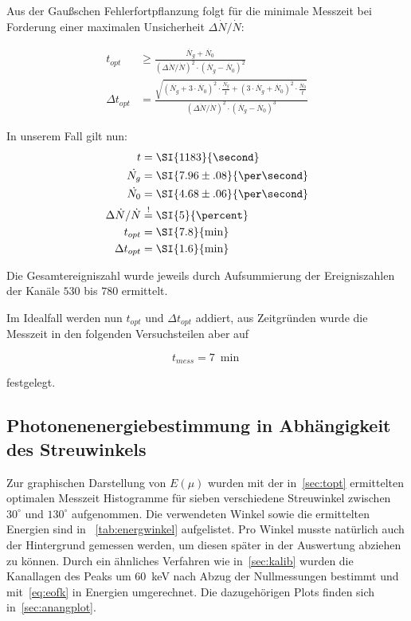 \documentclass[slug=CS, room=Andreas-Schubert-Bau\,\ Labor\ 406,
supervisor=Juliane\ Volkmer, coursedate=29.\ 11.\ 2019]{../../Lab_Report_LaTeX/lab_report}
\newcommand{\kev}[1]{\SI{#1}{\kilo\electronvolt}}
\begin{document}
Aus der Gau\ss{}schen Fehlerfortpflanzung folgt f\"ur die minimale
Messzeit bei Forderung einer maximalen Unsicherheit
\(\Delta\dot{N}/\dot{N}\):

\begin{align}
  \label{eq:mtime}
  t_{opt} & \geq\frac{\dot{N_g} +
            \dot{N_0}}{(\Delta\dot{N}/\dot{N})^2\cdot (\dot{N_g} -
            \dot{N_0})^2} \\
  \Delta t_{opt} &=\frac{\sqrt{(\dot{N_g} +
                   3\cdot\dot{N_0})^2\cdot\frac{\dot{N_g}}{t}
                   + (3\cdot\dot{N_g} + \dot{N_0})^2\cdot\frac{\dot{N_0}}{t}}}{(\Delta\dot{N}/\dot{N})^2\cdot (\dot{N_g} -
            \dot{N_0})^3}
\end{align}

In unserem Fall gilt nun:
\begin{align}
  t &=\SI{1183}{\second} \\
  \dot{N_g} &=\SI{7.96\pm.08}{\per\second} \\
  \dot{N_0} &=\SI{4.68\pm.06}{\per\second} \\
  \Delta\dot{N}/\dot{N} &\overset{!}{=}\SI{5}{\percent} \\
  t_{opt} &=\SI{7.8}{\min} \\
  \Delta t_{opt} &=\SI{1.6}{\min}
\end{align}

Die Gesamtereigniszahl wurde jeweils durch Aufsummierung der
Ereigniszahlen der Kan\"ale \(530\) bis \(780\) ermittelt.

Im Idealfall werden nun \(t_{opt}\) und \(\Delta t_{opt}\) addiert,
aus Zeitgr\"unden wurde die Messzeit in den folgenden Versuchsteilen
aber auf

\begin{equation}
  \label{eq:fmtime}
  t_{mess} = \SI{7}{\min}
\end{equation}

festgelegt.

\subsection{Photonenenergiebestimmung in Abhängigkeit des Streuwinkels}
\label{sec:energwinkel}

Zur graphischen Darstellung von \(E(\mu)\) wurden mit der
in~\ref{sec:topt} ermittelten optimalen Messzeit Histogramme für
sieben verschiedene Streuwinkel zwischen \(30^\circ\) und
\(130^\circ\) aufgenommen. Die verwendeten Winkel sowie die
ermittelten Energien sind in ~\ref{tab:energwinkel} aufgelistet. Pro
Winkel musste natürlich auch der Hintergrund gemessen werden, um
diesen später in der Auswertung abziehen zu können. Durch ein
\"ahnliches Verfahren wie in~\ref{sec:kalib} wurden die Kanallagen des
Peaks um \kev{60} nach Abzug der Nullmessungen bestimmt und
mit~\ref{eq:eofk} in Energien umgerechnet. Die dazugeh\"origen Plots
finden sich in~\ref{sec:anangplot}.
\end{document}
